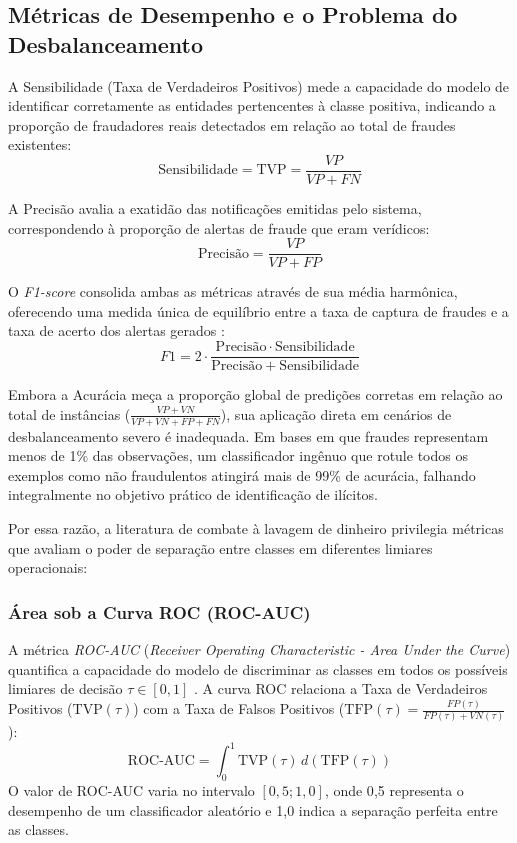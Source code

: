 \documentclass[titlepage,a4paper,oneside,onecolumn,12pt]{report}
\begin{document}
\subsection{Métricas de Desempenho e o Problema do Desbalanceamento}

A Sensibilidade (Taxa de Verdadeiros Positivos) mede a capacidade do modelo de identificar corretamente as entidades pertencentes à classe positiva, indicando a proporção de fraudadores reais detectados em relação ao total de fraudes existentes:
\begin{equation}
    \mathrm{Sensibilidade} = \mathrm{TVP} = \frac{VP}{VP+FN}
\end{equation}

A Precisão avalia a exatidão das notificações emitidas pelo sistema, correspondendo à proporção de alertas de fraude que eram verídicos:
\begin{equation}
    \text{Precisão} = \frac{VP}{VP+FP}
\end{equation}

O \textit{F1-score} consolida ambas as métricas através de sua média harmônica, oferecendo uma medida única de equilíbrio entre a taxa de captura de fraudes e a taxa de acerto dos alertas gerados \cite{alarab2020comparative}:
\begin{equation}
    F1 = 2 \cdot \frac{\text{Precisão} \cdot \mathrm{Sensibilidade}}{\text{Precisão} + \mathrm{Sensibilidade}}
\end{equation}

Embora a Acurácia meça a proporção global de predições corretas em relação ao total de instâncias ($ \frac{VP+VN}{VP+VN+FP+FN} $), sua aplicação direta em cenários de desbalanceamento severo é inadequada. Em bases em que fraudes representam menos de 1\% das observações, um classificador ingênuo que rotule todos os exemplos como não fraudulentos atingirá mais de 99\% de acurácia, falhando integralmente no objetivo prático de identificação de ilícitos.

Por essa razão, a literatura de combate à lavagem de dinheiro privilegia métricas que avaliam o poder de separação entre classes em diferentes limiares operacionais:

\subsubsection{Área sob a Curva ROC (ROC-AUC)}
A métrica \textit{ROC-AUC} (\textit{Receiver Operating Characteristic - Area Under the Curve}) quantifica a capacidade do modelo de discriminar as classes em todos os possíveis limiares de decisão $\tau \in [0, 1]$ \cite{fawcett2006introduction}. A curva ROC relaciona a Taxa de Verdadeiros Positivos ($\mathrm{TVP}(\tau)$) com a Taxa de Falsos Positivos ($\mathrm{TFP}(\tau) = \frac{FP(\tau)}{FP(\tau)+VN(\tau)}$):
\begin{equation}
    \mathrm{ROC\text{-}AUC} = \int_{0}^{1} \mathrm{TVP}(\tau) \, d(\mathrm{TFP}(\tau))
\end{equation}
O valor de ROC-AUC varia no intervalo $[0{,}5; 1{,}0]$, onde 0{,}5 representa o desempenho de um classificador aleatório e 1{,}0 indica a separação perfeita entre as classes.
\end{document}
